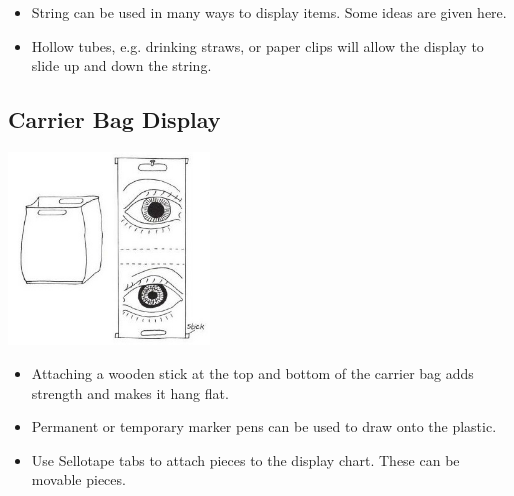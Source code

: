 \begin{multicols}{2}
\begin{itemize}
\item String can be used in many ways to display items. Some ideas are given here.
\item Hollow tubes, e.g. drinking
straws, or paper clips will allow
the display to slide up and
down the string.
\end{itemize}

\vfill
\columnbreak

\subsection{Carrier Bag Display}

\begin{center}
\includegraphics[width=0.4\textwidth]{./img/vso/carrier-bag.jpg}
\end{center}

\begin{itemize}
\item Attaching a wooden stick at the
top and bottom of the carrier
bag adds strength and makes it
hang flat.
\item Permanent or temporary marker pens can be
used to draw onto the plastic.
\item Use Sellotape tabs to attach
pieces to the display chart.
These can be movable pieces.
\end{itemize}


%


\end{multicols}
